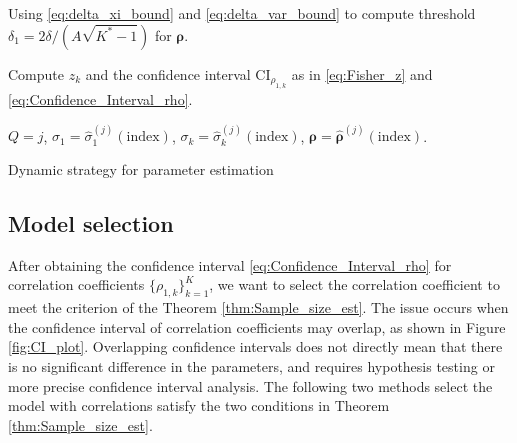 \begin{algorithm}[!ht]
{    
    {

    Using \eqref{eq:delta_xi_bound} and \eqref{eq:delta_var_bound} to compute threshold $\delta_1 = 2\delta/(A \sqrt{K^* - 1})$ for $\boldsymbol{\rho}$.
    
    Compute $z_k$ and the confidence interval $\text{CI}_{\rho_{1,k}}$ as in \eqref{eq:Fisher_z} and \eqref{eq:Confidence_Interval_rho}.
    

    
    {
    }
    }
    
    
    }    
    
    $Q=j$, $\sigma_1 = \widehat\sigma_1^{(j)}(\text{index})$, $\sigma_k = \widehat\sigma_k^{(j)}(\text{index})$, $\boldsymbol{\rho} = \widehat{\boldsymbol{\rho}}^{(j)}(\text{index})$.
\caption{Dynamic strategy for parameter estimation}\label{algo:Parameter_Estimation}
\end{algorithm}


\subsection{Model selection}\label{sec:Model_Selection}
After obtaining the confidence interval \eqref{eq:Confidence_Interval_rho} for correlation coefficients $\{\rho_{1,k}\}_{k=1}^{K}$, we want to select the correlation coefficient to meet the criterion of the Theorem \ref{thm:Sample_size_est}. The issue occurs when the confidence interval of correlation coefficients may overlap, as shown in Figure \ref{fig:CI_plot}. Overlapping confidence intervals does not directly mean that there is no significant difference in the parameters, and requires hypothesis testing or more precise confidence interval analysis. The following two methods select the model with correlations satisfy the two conditions in Theorem \ref{thm:Sample_size_est}. 
\newline 

